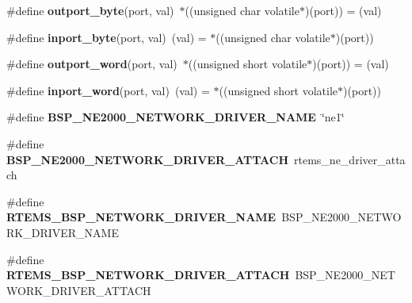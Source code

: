 \begin{DoxyCompactItemize}
\item 
\mbox{\label{group__RTEMSBSPsARMGumstix_ga2dc8bbb66a1c044d5f0242443de13597}} 
\#define {\bfseries outport\+\_\+byte}(port,  val)~$\ast$((unsigned char volatile$\ast$)(port)) = (val)
\item 
\mbox{\label{group__RTEMSBSPsARMGumstix_ga4a97bc3c22f3666f21b5eb4d49bc3ea7}} 
\#define {\bfseries inport\+\_\+byte}(port,  val)~(val) = $\ast$((unsigned char volatile$\ast$)(port))
\item 
\mbox{\label{group__RTEMSBSPsARMGumstix_ga7d0d5185114711bf96815bfaa7521145}} 
\#define {\bfseries outport\+\_\+word}(port,  val)~$\ast$((unsigned short volatile$\ast$)(port)) = (val)
\item 
\mbox{\label{group__RTEMSBSPsARMGumstix_gae68dc6ec475893306000d70c519d966c}} 
\#define {\bfseries inport\+\_\+word}(port,  val)~(val) = $\ast$((unsigned short volatile$\ast$)(port))
\item 
\mbox{\label{group__RTEMSBSPsARMGumstix_gac6c911dfcfde7c091f015e594985edd4}} 
\#define {\bfseries B\+S\+P\+\_\+\+N\+E2000\+\_\+\+N\+E\+T\+W\+O\+R\+K\+\_\+\+D\+R\+I\+V\+E\+R\+\_\+\+N\+A\+ME}~\char`\"{}ne1\char`\"{}
\item 
\mbox{\label{group__RTEMSBSPsARMGumstix_ga692f56bd01099425e29a1ff59164c65f}} 
\#define {\bfseries B\+S\+P\+\_\+\+N\+E2000\+\_\+\+N\+E\+T\+W\+O\+R\+K\+\_\+\+D\+R\+I\+V\+E\+R\+\_\+\+A\+T\+T\+A\+CH}~rtems\+\_\+ne\+\_\+driver\+\_\+attach
\item 
\mbox{\label{group__RTEMSBSPsARMGumstix_ga86d4f9aa98431100692e31068070a8df}} 
\#define {\bfseries R\+T\+E\+M\+S\+\_\+\+B\+S\+P\+\_\+\+N\+E\+T\+W\+O\+R\+K\+\_\+\+D\+R\+I\+V\+E\+R\+\_\+\+N\+A\+ME}~B\+S\+P\+\_\+\+N\+E2000\+\_\+\+N\+E\+T\+W\+O\+R\+K\+\_\+\+D\+R\+I\+V\+E\+R\+\_\+\+N\+A\+ME
\item 
\mbox{\label{group__RTEMSBSPsARMGumstix_gadde0d66aef9442971dde465292ac14e6}} 
\#define {\bfseries R\+T\+E\+M\+S\+\_\+\+B\+S\+P\+\_\+\+N\+E\+T\+W\+O\+R\+K\+\_\+\+D\+R\+I\+V\+E\+R\+\_\+\+A\+T\+T\+A\+CH}~B\+S\+P\+\_\+\+N\+E2000\+\_\+\+N\+E\+T\+W\+O\+R\+K\+\_\+\+D\+R\+I\+V\+E\+R\+\_\+\+A\+T\+T\+A\+CH
\end{DoxyCompactItemize}
